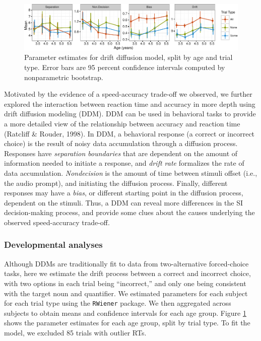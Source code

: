 \documentclass[10pt, letterpaper]{article}
\newenvironment{CodeChunk}{}{}
\begin{document}
\begin{CodeChunk}
\begin{figure}[t]

{\centering \includegraphics{figs/devo_param_plot-1} 

}

\caption[Parameter estimates for drift diffusion model, split by age and trial type]{Parameter estimates for drift diffusion model, split by age and trial type. Error bars are 95 percent confidence intervals computed by nonparametric bootstrap.}\label{fig:devo_param_plot}
\end{figure}
\end{CodeChunk}

Motivated by the evidence of a speed-accuracy trade-off we observed, we
further explored the interaction between reaction time and accuracy in
more depth using drift diffusion modeling (DDM). DDM can be used in
behavioral tasks to provide a more detailed view of the relationship
between accuracy and reaction time (Ratcliff \& Rouder, 1998). In DDM, a
behavioral response (a correct or incorrect choice) is the result of
noisy data accumulation through a diffusion process. Responses have
\emph{separation boundaries} that are dependent on the amount of
information needed to initiate a response, and \emph{drift rate}
formalizes the rate of data accumulation. \emph{Nondecision} is the
amount of time between stimuli offset (i.e., the audio prompt), and
initiating the diffusion process. Finally, different responses may have
a \emph{bias}, or different starting point in the diffusion process,
dependent on the stimuli. Thus, a DDM can reveal more differences in the
SI decision-making process, and provide some clues about the causes
underlying the observed speed-accuracy trade-off.

\subsubsection{Developmental analyses}\label{developmental-analyses}

Although DDMs are traditionally fit to data from two-alternative
forced-choice tasks, here we estimate the drift process between a
correct and incorrect choice, with two options in each trial being
``incorrect,'' and only one being consistent with the target noun and
quantifier. We estimated parameters for each subject for each trial type
using the \texttt{RWiener} package. We then aggregated across subjects
to obtain means and confidence intervals for each age group. Figure
\ref{fig:devo_param_plot} shows the parameter estimates for each age
group, split by trial type. To fit the model, we excluded 85 trials with
outlier RTs.
\end{document}
